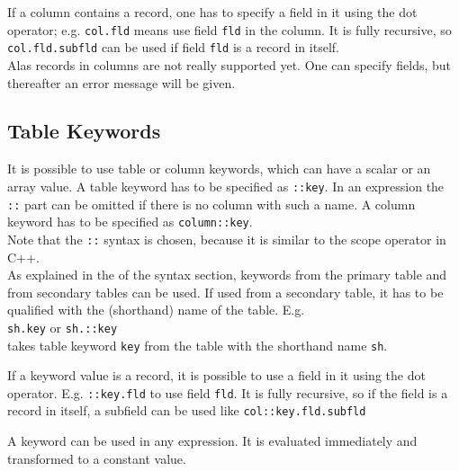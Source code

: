 If a column contains a record, one has to specify a field in it
using the dot operator; e.g. \texttt{col.fld} means use field
\texttt{fld} in the column. It is fully recursive, so
\texttt{col.fld.subfld} can be used if field \texttt{fld} is a record
in itself.
\\Alas records in columns are not really supported yet. One can specify
fields, but thereafter an error message will be given.

\subsection{\label{TAQL:KEYWORDS}Table Keywords}
It is possible to use table or column keywords, which can have
a scalar or an array value. A table keyword has to be specified
as \texttt{::key}. In an expression the \texttt{::} part can be omitted
if there is no column with such a name.
A column keyword has to be specified as \texttt{column::key}.
\\Note that the \texttt{::} syntax is chosen, because it is similar
to the scope operator in C++.
\\
As explained in the  of the syntax
section, keywords from the primary table and from secondary tables
can be used. If used from a secondary table, it has to be qualified
with the (shorthand) name of the table. E.g.
\\\texttt{sh.key} or \texttt{sh.::key}
\\takes table keyword \texttt{key} from the table with the shorthand name
\texttt{sh}.

If a keyword value is a record, it is possible to use
a field in it using the dot operator. E.g. \texttt{::key.fld}
to use field \texttt{fld}. It is fully recursive, so if the
field is a record in itself, a subfield can be used like
\texttt{col::key.fld.subfld}

A keyword can be used in any expression. It is evaluated immediately
and transformed to a constant value.

